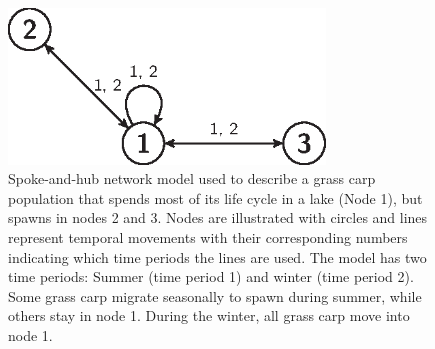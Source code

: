 \documentclass{article}[12pt]
\begin{document}
\begin{figure}[htbp]
   \centering  
   \includegraphics[width=0.75\textwidth]{Figure3.eps} %
   \caption{Spoke-and-hub network model used to describe a grass carp population that spends most of its life cycle in a lake (Node 1), but spawns in nodes 2 and 3. Nodes are illustrated with circles and lines represent temporal movements with their corresponding numbers indicating which time periods the lines are used. The model has two time periods: Summer (time period 1) and winter (time period 2). Some grass carp migrate seasonally to spawn during summer, while others stay in node 1. During the winter, all grass carp move into node 1.}
   \label{fig:spokeHub}
\end{figure}
\end{document}
